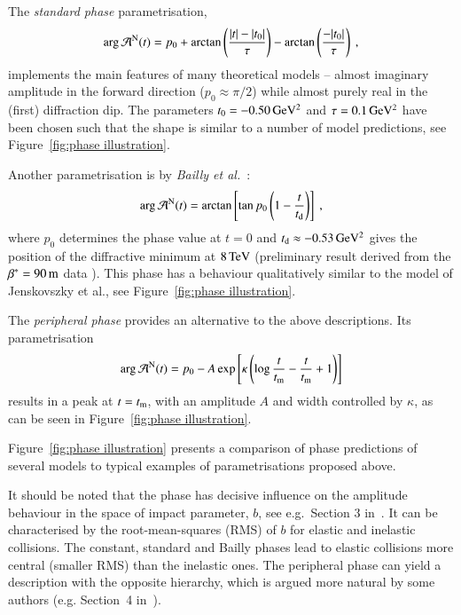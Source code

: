 The {\it standard phase} parametrisation,
\begin{equation}
\label{eqn:nuc phase std}
\arg {\cal A}^{\rm N}(t) = p_{0} + \arctan \left(\frac{|t|-|t_{0}|}{\tau}\right) -  \arctan \left(\frac{-|t_{0}|}{\tau}\right) \: ,
\end{equation}
implements the main features of many theoretical models -- almost imaginary amplitude in the forward direction ($p_0 \approx \pi/2$) while almost purely real in the (first) diffraction dip. The parameters $t_0 = - 0.50\,{\rm GeV^2}$ and $\tau = 0.1\,{\rm GeV^2}$ have been chosen such that the shape is similar to a number of model predictions, see Figure~\ref{fig:phase illustration}.

Another parametrisation is by {\em Bailly et al.}~\cite{bailly87}:
\begin{equation}
\label{eq:nuc phase bai}
	\arg {\cal A}^{\rm N}(t) = \arctan \left[ \tan p_0 \left(1 - {t\over t_{\rm d}} \right) \right]\ ,
\end{equation}
where $p_0$ determines the phase value at $t=0$ and $t_{\rm d} \approx -0.53\,{\rm GeV^2}$ gives the position of the diffractive minimum at $8\,{\rm TeV}$ (preliminary result derived from the $\beta^* = 90\,{\rm m}$ data \cite{8tev-90m}). This phase has a behaviour qualitatively similar to the model of Jenskovszky et al., see Figure~\ref{fig:phase illustration}.

The {\it peripheral phase} \cite{kl94} provides an alternative to the above descriptions. Its parametrisation
\begin{equation}
\label{eq:nuc phase per}
\arg {\cal A}^{\rm N}(t) = p_0 - A \exp\left[ \kappa \left( \log {t\over t_{\rm m}} - {t\over t_{\rm m}} + 1 \right) \right]
\end{equation}
results in a peak at $t = t_{\rm m}$, with an amplitude $A$ and width controlled by $\kappa$, as can be seen in Figure~\ref{fig:phase illustration}.

Figure~\ref{fig:phase illustration} presents a comparison of phase predictions of several models to typical examples of parametrisations proposed above.

It should be noted that the phase has decisive influence on the amplitude behaviour in the space of impact parameter, $b$, see e.g.~Section 3 in~\cite{klk02}. It can be characterised by the root-mean-squares (RMS) of $b$ for elastic and inelastic collisions. The constant, standard and Bailly phases lead to elastic collisions more central (smaller RMS) than the inelastic ones. The peripheral phase can yield a description with the opposite hierarchy, which is argued more natural by some authors (e.g. Section~4 in~\cite{kl96}).

